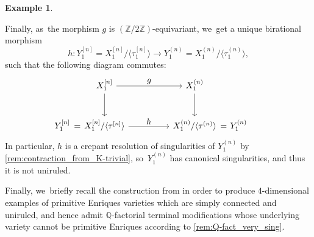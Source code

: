 \documentclass[JEP,XML,SOM,Unicode,published]{cedram}
\newenvironment{enumeratea}
{\bgroup\def\theenumi{\alph{enumi}}\begin{enumerate}}
{\end{enumerate}\egroup}
\renewcommand\theenumi{\roman{enumi}}
\let\ts\textstyle
\theoremstyle{plain}
\theoremstyle{definition}
\newtheorem{exa}[thm]{Example}
\newcommand{\Z}{\mathbb{Z}}
\newcommand{\Q}{\mathbb{Q}}
\begin{document}
\begin{exa}
\begin{enumeratea}
Finally, as~the morphism $g$ is $(\Z / 2\Z)$-equivariant, we~get a unique birational morphism
\[
h \colon Y_1^{[n]} = X_1^{[n]} / \langle \tau_1^{[n]} \rangle \to Y_1^{(n)} = X_1^{(n)} / \langle \tau_1^{(n)} \rangle,
\]
such that the following diagram commutes:
\[
\begin{tikzcd}[column sep = huge, row sep = large, /tikz/column 1/.append style={column sep = 0pt, inner xsep = 0pt}]
& X_1^{[n]} \arrow[d] \arrow[r, "\ts g"] & X_1^{(n)} \arrow[d] \\
Y_1^{[n]} \hspace{2pt} =
& X_1^{[n]} / \langle \tau^{[n]} \rangle \arrow[r, "\ts h"] & X_1^{(n)} / \langle \tau^{(n)} \rangle & \hspace{-6.5em} = \hspace{1pt} Y_1^{(n)}
\end{tikzcd}
\]
In particular, $h$ is a crepant resolution of singularities of $Y_1^{(n)}$ by \autoref{rem:contraction_from_K-trivial}, so~$Y_1^{(n)}$ has canonical singularities, and thus it is not uniruled.
\end{enumeratea}
\end{exa}

Finally, we~briefly recall the construction from \cite[\S 4]{BHS25} in order to produce $4$-dimensional examples of primitive Enriques varieties which are simply connected and uniruled, and hence admit $\Q$\nobreakdash-factorial terminal modifications whose underlying variety cannot be primitive Enriques according to \autoref{rem:Q-fact_very_sing}.
\end{document}
